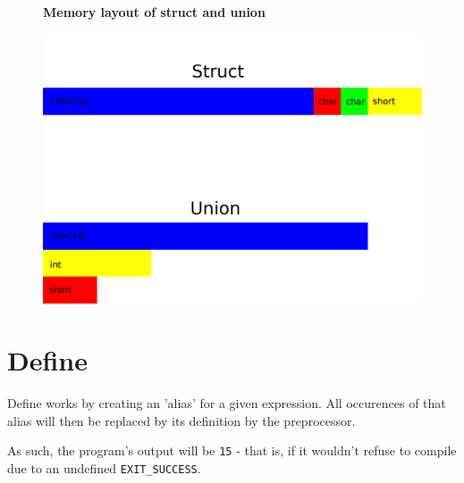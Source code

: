 \documentclass[a4paper]{scrartcl}
\begin{document}
\begin{figure}
	\centering
	\textbf{Memory layout of struct and union}\par\medskip
	\includegraphics[width=\textwidth]{resources/memory_layout.png}
\end{figure}

\section{Define}

Define works by creating an 'alias' for a given expression. All occurences of
that alias will then be replaced by its definition by the preprocessor.

As such, the program's output will be \texttt{15} - that is, if it wouldn't
refuse to compile due to an undefined \texttt{EXIT\_SUCCESS}.
\end{document}
